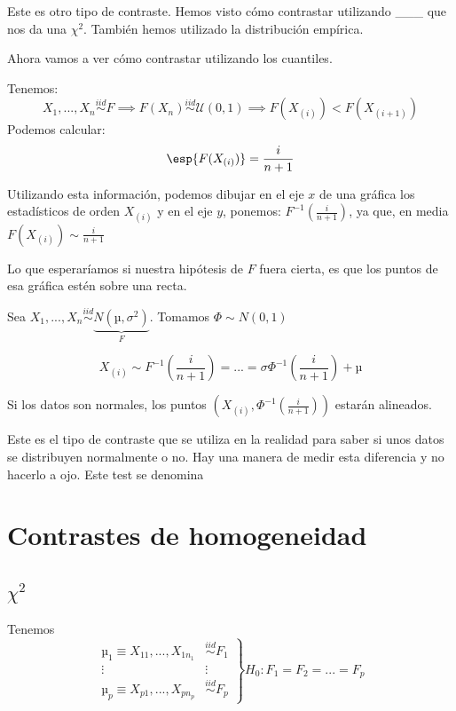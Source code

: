 Este es otro tipo de contraste. Hemos visto cómo contrastar utilizando \_\_\_ que nos da una $\chi^2$. También hemos utilizado la distribución empírica.

Ahora vamos a ver cómo contrastar utilizando los cuantiles.

Tenemos:
\[
X_1,...,X_n \overset{iid}{\sim} F \implies F(X_n) \overset{iid}{\sim}\mathcal{U}(0,1) \implies F(X_{(i)}) < F(X_{(i+1)})
\]
Podemos calcular:
\[\esp{F(X_{(i)})} = \frac{i}{n+1}\]


Utilizando esta información, podemos dibujar en el eje $x$ de una gráfica los estadísticos de orden $X_{(i)}$ y en el eje $y$, ponemos: $F^{-1}\left(\frac{i}{n+1}\right)$, ya que, en media $F(X_{(i)}) \sim \frac{i}{n+1}$

Lo que esperaríamos si nuestra hipótesis de $F$ fuera cierta, es que los puntos de esa gráfica estén sobre una recta.


\begin{example}
Sea $X_1,...,X_n \overset{iid}{\sim} \underbrace{N(µ,σ^2)}_{F}$. Tomamos $\Phi \sim N(0,1)$


\[X_{(i)} \sim F^{-1}\left(\frac{i}{n+1}\right) = ... = σ\Phi^{-1}\left(\frac{i}{n+1}\right) + µ\]

Si los datos son normales, los puntos $\left( X_{(i)},\Phi^{-1}\left(\frac{i}{n+1}\right)\right)$ estarán alineados.

\end{example}

\obs Este es el tipo de contraste que se utiliza en la realidad para saber si unos datos se distribuyen normalmente o no. Hay una manera de medir esta diferencia y no hacerlo a ojo. Este test se denomina 




\section{Contrastes de homogeneidad}
\subsection{$\chi^2$ }
Tenemos \[
\left.
\begin{array}{cc}
µ_{1} \equiv X_{11} ,...,X_{1n_1} &\overset{iid}{\sim} F_1\\ 
\vdots & \vdots \\
µ_{p} \equiv X_{p1} ,...,X_{pn_p} &\overset{iid}{\sim} F_p
\end{array} \right\} H_0 : F_1 = F_2 = ... = F_p 
\]

